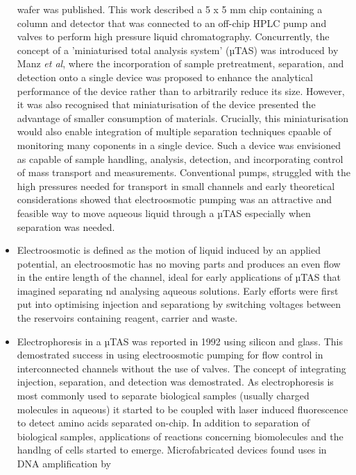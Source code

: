 \begin{itemize}
  wafer was published\citep{manz1990design}. This work described a 5 x 5 mm chip containing a
  column and detector that was connected to an off-chip HPLC pump and valves to perform high pressure
  liquid chromatography. Concurrently, the concept of a 'miniaturised total analysis system' (µTAS) was introduced
  by Manz \textit{et al}\citep{manz1990miniaturized}, where the incorporation of sample pretreatment, separation,
  and detection onto a single device was proposed to enhance the analytical performance of the device rather
  than to arbitrarily reduce its size. However, it was also recognised that miniaturisation of the device
  presented the advantage of smaller consumption of materials. Crucially, this miniaturisation would also
  enable integration of multiple separation techniques cpaable of monitoring many coponents in a single device. Such
  a device was envisioned as capable of sample handling, analysis, detection, and incorporating control of
  mass transport and measurements. Conventional pumps, struggled with the high pressures needed for transport
  in small channels and early theoretical considerations showed that electroosmotic pumping was an attractive and
  feasible way to move aqueous liquid through a µTAS especially when separation was needed.
  \item Electroosmotic is defined as the motion of liquid induced by an applied potential, an electroosmotic
  has no moving parts and produces an even flow in the entire length of the channel, ideal for early applications
  of µTAS that imagined separating nd analysing aqueous solutions. Early efforts were first put into optimising
  injection and separationg by switching voltages between the reservoirs containing reagent, carrier and
  waste\citep{manz1991integrated}.
  \item Electrophoresis in a µTAS was reported in 1992 using silicon and glass\citep{harrison1992capillary}. This
  demostrated success in using electroosmotic pumping for flow control in interconnected channels without the
  use of valves. The concept of integrating injection, separation, and detection was demostrated. As electrophoresis
  is most commonly used to separate biological samples (usually charged molecules in aqueous) it started to be
  coupled with laser induced fluorescence to detect amino acids separated on-chip\citep{seiler1993planar}. In
  addition to separation of biological samples, applications of reactions concerning biomolecules and the
  handlng of cells started to emerge. Microfabricated devices found uses in DNA amplification by

\end{itemize}
